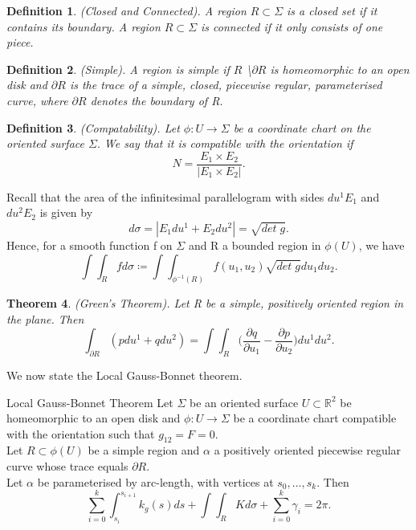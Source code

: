 \documentclass[twoside]{article}
\newcounter{lecnum}
\newtheorem{theorem}{Theorem}[lecnum]
\newtheorem{definition}[theorem]{Definition}
\begin{document}
\begin{definition}(Closed and Connected). A region $R \subset \Sigma$ is a closed set if it contains its boundary. A region $R \subset \Sigma$ is connected if it only consists of one piece.
\end{definition}

\begin{definition}(Simple). A region is simple if $R$ \textbackslash $\partial R$ is homeomorphic to an open disk and $\partial R$ is the trace of a simple, closed, piecewise regular, parameterised curve, where $\partial R$ denotes the boundary of R.
\end{definition}

\begin{definition}(Compatability). Let $\phi:U \rightarrow \Sigma$ be a coordinate chart on the oriented surface $\Sigma.$ We say that it is compatible with the orientation if 
$$
N = \frac{E_1 \times E_2}{|E_1 \times E_2|}.
$$
\end{definition}

Recall that the area of the infinitesimal parallelogram with sides $du^1E_1$ and $du^2E_2$ is given by 
$$
d\sigma = |E_1du^1 + E_2du^2| = \sqrt{det \; g}.
$$
Hence, for a smooth function f on $\Sigma$ and R a bounded region in $\phi(U)$, we have 
$$
\int \int_Rfd\sigma \coloneqq \int\int_{\phi^{-1}(R)}f(u_1,u_2)\sqrt{det \; g}du_1du_2.
$$


\begin{theorem}(Green's Theorem). Let R be a simple, positively oriented region in the plane. Then 
$$
\int_{\partial R}(pdu^1 + qdu^2) = \int \int_{R}\bigg(\frac{\partial q}{\partial u_1} - \frac{\partial p}{\partial u_2} \bigg)du^1du^2.
$$
\end{theorem}

We now state the Local Gauss-Bonnet theorem.
\begin{theorem_exam}{Local Gauss-Bonnet Theorem}{} Let $\Sigma$ be an oriented surface $U \subset \mathbb{R}^2$ be homeomorphic to an open disk and $\phi: U \rightarrow \Sigma$ be a coordinate chart compatible with the orientation such that $g_{12} = F = 0.$\\Let $R \subset \phi(U)$ be a simple region and $\alpha$ a positively oriented piecewise regular curve whose trace equals $\partial R.$\\ Let $\alpha$ be parameterised by arc-length, with vertices at $s_0, ..., s_k.$ Then 
$$
\sum_{i=0}^{k}\int_{s_i}^{s_{i+1}}k_g(s)ds + \int \int_{R}Kd\sigma + \sum_{i=0}^{k}\gamma_i = 2\pi.
$$
\end{theorem_exam}
\end{document}
